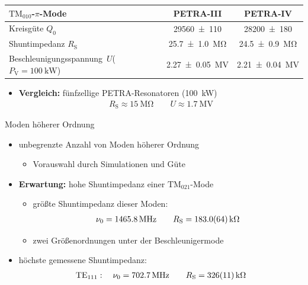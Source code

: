 \documentclass[12pt,xcolor=dvipsnames,professionalfonts]{beamer}
\begin{document}
\begin{frame}
	\centering
	{\def\arraystretch{2}\tabcolsep=10pt
	\begin{tabular}{p{3.5cm}|cc} \toprule
		$\mathrm{TM}_{010}$-$\pi$-Mode & \textbf{PETRA-III} & \textbf{PETRA-IV} \\ \midrule
		Kreisgüte $Q_0$ & \num{29560 +- 110} & \num{28200 +- 180} \\
		Shuntimpedanz $R_\mathrm{S}$ & \SI{25.7 +- 1.0}{\mega\ohm} & \SI{24.5 +- 0.9}{\mega\ohm} \\
		Beschleunigungs\-spannung~$U$\newline($P_\mathrm{V} = \SI{100}{\kilo\watt}$)& \SI{2.27 +- 0.05}{\mega\volt} & \SI{2.21 +- 0.04}{\mega\volt} \\
	\end{tabular}
	}
	\vspace*{0.5cm}
	\begin{itemize}
		\item \textbf{Vergleich:} fünfzellige PETRA-Resonatoren (\SI{100}{kW})
		\begin{align*}
			R_\mathrm{S} \approx \SI{15}{\mega\ohm} \qquad U \approx \SI{1.7}{\mega\volt}
		\end{align*}
	\end{itemize}
\end{frame}

\begin{frame}{Moden höherer Ordnung}
	\begin{itemize}
		\setlength\itemsep{1.25em}
		\item unbegrenzte Anzahl von Moden höherer Ordnung
		\begin{itemize}
			\item Vorauswahl durch Simulationen und Güte
		\end{itemize}
		
		\item \textbf{Erwartung:} hohe Shuntimpedanz einer $\mathrm{TM}_{021}$-Mode
		\begin{itemize}
			\item größte Shuntimpedanz dieser Moden:
			\begin{align*}
			\nu_0 = \SI{1465.8}{\mega\hertz}\qquad R_\mathrm{S} = \SI{183.0 +- 6.4}{\kilo\ohm}
			\end{align*}
			\item zwei Größenordnungen unter der Beschleunigermode
		\end{itemize}
		
		\item höchste gemessene Shuntimpedanz:
		\begin{align*}
			\mathrm{TE}_{111}: \quad \nu_0 = \SI{702.7}{\mega\hertz} \qquad R_\mathrm{S} = \SI{326 +- 11}{\kilo\ohm}
		\end{align*}
	\end{itemize}
\end{frame}
\end{document}

